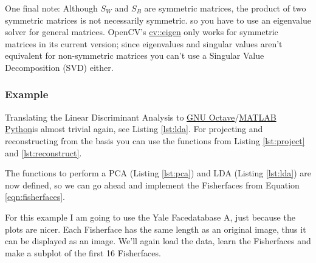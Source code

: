 One final note: Although $S_{W}$ and $S_{B}$ are symmetric matrices, the product of two symmetric matrices is not necessarily symmetric. so you have to use an eigenvalue solver for general matrices. OpenCV's \href{http://opencv.willowgarage.com/documentation/cpp/operations_on_arrays.html#cv-eigen}{cv::eigen} only works for symmetric matrices in its current version; since eigenvalues and singular values aren't equivalent for non-symmetric matrices you can't use a Singular Value Decomposition (SVD) either.

\subsubsection{Example}

\label{ssection:example_fisherfaces}

Translating the Linear Discriminant Analysis to \ifx\python\undefined \href{http://www.gnu.org/software/octave/}{GNU Octave}/\href{http://www.mathworks.com}{MATLAB} \else \href{http://www.python.org}{Python}\fi is almost trivial again, see Listing \ref{lst:lda}. For projecting and reconstructing from the basis you can use the functions from Listing \ref{lst:project} and \ref{lst:reconstruct}.
\ifx\python\undefined
	
\else
		
\fi

The functions to perform a PCA (Listing \ref{lst:pca}) and LDA (Listing \ref{lst:lda}) are now defined, so we can go ahead and implement the Fisherfaces from Equation \ref{eqn:fisherfaces}. 

\ifx\python\undefined
	
\else
	
\fi

For this example I am going to use the Yale Facedatabase A, just because the plots are nicer. Each Fisherface has the same length as an original image, thus it can be displayed as an image. We'll again load the data, learn the Fisherfaces and make a subplot of the first 16 Fisherfaces.

\ifx\python\undefined
	
\else
	
\fi

